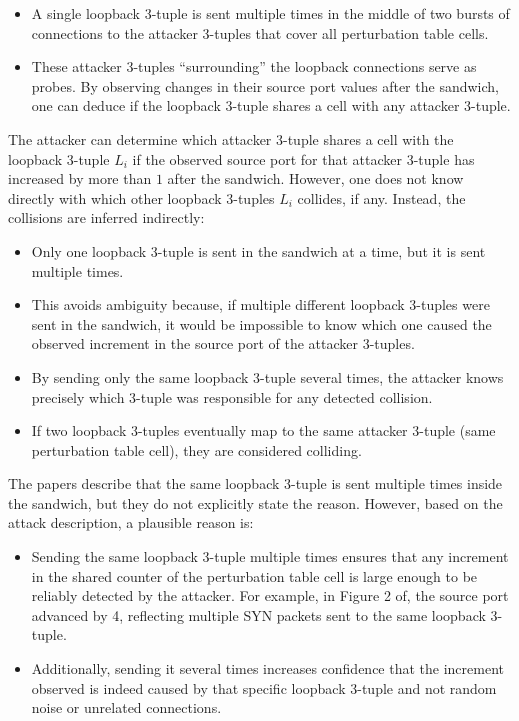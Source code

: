 \documentclass{report}
\begin{document}
\begin{itemize}
	\item A single loopback 3-tuple is sent multiple times in the middle of two bursts of connections to the attacker 3-tuples that cover all perturbation table cells.
	\item These attacker 3-tuples “surrounding” the loopback connections serve as probes. By observing changes in their source port values after the sandwich, one can deduce if the loopback 3-tuple shares a cell with any attacker 3-tuple.
\end{itemize}

The attacker can determine which attacker 3-tuple shares a cell with the loopback 3-tuple $L_i$ if the observed source port for that attacker 3-tuple has increased by more than $1$ after the sandwich. However, one does not know directly with which other loopback 3-tuples $L_i$ collides, if any. Instead, the collisions are inferred indirectly:

\begin{itemize}
	\item Only one loopback 3-tuple is sent in the sandwich at a time, but it is sent multiple times.
	\item This avoids ambiguity because, if multiple different loopback 3-tuples were sent in the sandwich, it would be impossible to know which one caused the observed increment in the source port of the attacker 3-tuples.
	\item By sending only the same loopback 3-tuple several times, the attacker knows precisely which 3-tuple was responsible for any detected collision.
	\item If two loopback 3-tuples eventually map to the same attacker 3-tuple (same perturbation table cell), they are considered colliding.
\end{itemize}

The papers describe that the same loopback 3-tuple is sent multiple times inside the sandwich, but they do not explicitly state the reason. However, based on the attack description, a plausible reason is:

\begin{itemize}
	\item Sending the same loopback 3-tuple multiple times ensures that any increment in the shared counter of the perturbation table cell is large enough to be reliably detected by the attacker. For example, in Figure 2 of, the source port advanced by 4, reflecting multiple SYN packets sent to the same loopback 3-tuple.
	\item Additionally, sending it several times increases confidence that the increment observed is indeed caused by that specific loopback 3-tuple and not random noise or unrelated connections.
\end{itemize}
\end{document}
